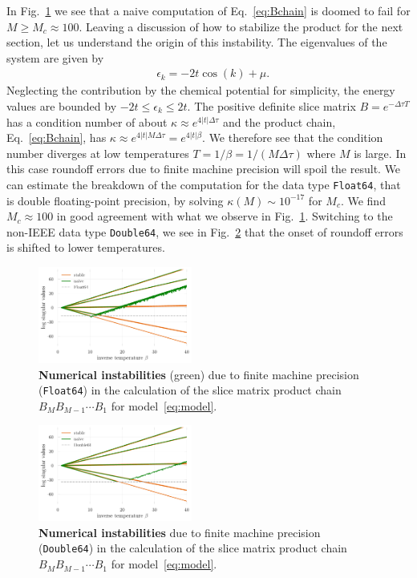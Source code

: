 \documentclass[%
 reprint,
superscriptaddress,
citeautoscript,
showpacs,
 amsmath,amssymb,
 aps,
 prb,
longbibliography,
]{revtex4-1}
\begin{document}
In Fig.~\ref{fig:naive_vs_stable} we see that a naive computation of Eq.~\ref{eq:Bchain} is doomed to fail for $M \geq M_c \approx 100$. Leaving a discussion of how to stabilize the product for the next section, let us understand the origin of this instability. The eigenvalues of the system are given by
\begin{align}
	&\epsilon_k = -2t\cos(k) + \mu.
\end{align}
Neglecting the contribution by the chemical potential for simplicity, the energy values are bounded by $-2t \leq \epsilon_k \leq 2t$. The positive definite slice matrix $B = e^{-\Delta \tau T}$ has a condition number of about $\kappa \approx e^{4|t|\Delta \tau}$ and the product chain, Eq.~\ref{eq:Bchain}, has $\kappa \approx e^{4|t|M\Delta \tau} = e^{4|t|\beta}$. We therefore see that the condition number diverges at low temperatures $T=1/\beta = 1/(M \Delta\tau)$ where $M$ is large. In this case roundoff errors due to finite machine precision will spoil the result. We can estimate the breakdown of the computation for the data type \texttt{Float64}, that is double floating-point precision\cite{Goldberg1991}, by solving $\kappa(M) \sim 10^{-17}$ for $M_c$. We find $M_c \approx 100$ in good agreement with what we observe in Fig.~\ref{fig:naive_vs_stable}. Switching to the non-IEEE data type \texttt{Double64}, we see in Fig.~\ref{fig:naive_vs_stable_db64} that the onset of roundoff errors is shifted to lower temperatures.

\begin{figure}[t]
	\includegraphics[width=0.45\textwidth]{figures/naive_vs_stable.pdf}
	\caption{\textbf{Numerical instabilities} (green) due to finite machine precision (\texttt{Float64}) in the calculation of the slice matrix product chain $B_M B_{M-1} \cdots B_1$ for model~\eqref{eq:model}. \label{fig:naive_vs_stable}}
\end{figure}

\begin{figure}[t]
	\includegraphics[width=0.45\textwidth]{figures/naive_vs_stable_db64.pdf}
	\caption{\textbf{Numerical instabilities} due to finite machine precision (\texttt{Double64}) in the calculation of the slice matrix product chain $B_M B_{M-1} \cdots B_1$ for model~\eqref{eq:model}. \label{fig:naive_vs_stable_db64}}
\end{figure}
\end{document}
